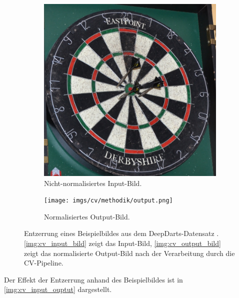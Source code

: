 \begin{figure}
    \centering
    \begin{subfigure}{0.45\textwidth}
        \centering
        \includegraphics[width=\textwidth]{imgs/cv/methodik/input.jpg}
        \caption{Nicht-normalisiertes Input-Bild.}
        \label{img:cv_input_bild}
    \end{subfigure}
    \hfill
    \begin{subfigure}{0.45\textwidth}
        \centering\texttt{[image: imgs/cv/methodik/output.png]}
        \caption{Normalisiertes Output-Bild.}
        \label{img:cv_output_bild}
    \end{subfigure}
    \caption{Entzerrung eines Beispielbildes aus dem DeepDarts-Datensatz \cite{deepdarts-data}. \autoref{img:cv_input_bild} zeigt das Input-Bild, \autoref{img:cv_output_bild} zeigt das normalisierte Output-Bild nach der Verarbeitung durch die CV-Pipeline.}
    \label{img:cv_input_ouptut}
\end{figure}

Der Effekt der Entzerrung anhand des Beispielbildes ist in \autoref{img:cv_input_ouptut} dargestellt.
